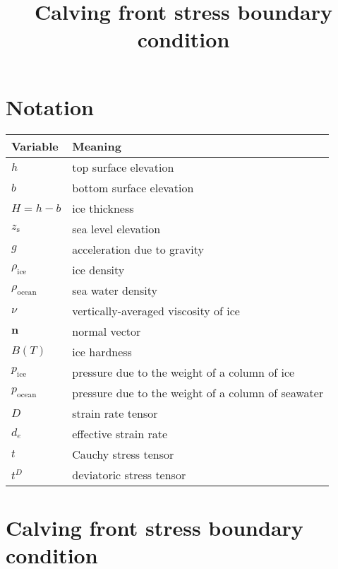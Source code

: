 \documentclass[11pt]{article}
\date{}
\title{Calving front stress boundary condition}
\begin{document}
\maketitle
\newcommand{\diff}[2]{\frac{\partial #1}{\partial #2}}
\newcommand{\n}{\mathbf{n}}
\newcommand{\nx}{\n_{x}}
\newcommand{\ny}{\n_{y}}
\newcommand{\nz}{\n_{z}}
\newcommand{\psw}{p_{\text{ocean}}}
\newcommand{\pice}{p_{\text{ice}}}
\newcommand{\rhoi}{\rho_{\text{ice}}}
\newcommand{\rhosw}{\rho_{\text{ocean}}}
\newcommand{\zs}{z_{\text{s}}}
\newcommand{\td}[1]{t^{D}_{#1}}
\newcommand{\D}{\displaystyle}
\newcommand{\dx}{\Delta x}
\newcommand{\dy}{\Delta y}
\newcommand{\viscosity}{\nu}

\section{Notation}
\label{sec-1}

\begin{center}
\begin{tabular}{ll}
\textbf{\textbf{Variable}} & \textbf{\textbf{Meaning}}\\
\hline
$h$ & top surface elevation\\
$b$ & bottom surface elevation\\
$H = h - b$ & ice thickness\\
$\zs$ & sea level elevation\\
$g$ & acceleration due to gravity\\
$\rhoi$ & ice density\\
$\rhosw$ & sea water density\\
$\viscosity$ & vertically-averaged viscosity of ice\\
$\n$ & normal vector\\
$B(T)$ & ice hardness\\
$\pice$ & pressure due to the weight of a column of ice\\
$\psw$ & pressure due to the weight of a column of seawater\\
$D$ & strain rate tensor\\
$d_{e}$ & effective strain rate\\
$t$ & Cauchy stress tensor\\
$t^{D}$ & deviatoric stress tensor\\
\end{tabular}
\end{center}

\section{Calving front stress boundary condition}
\label{sec-2}
\end{document}
